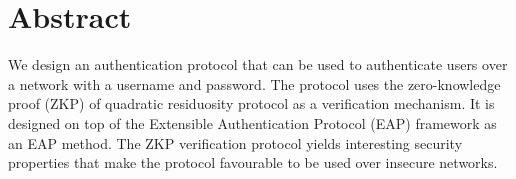 \section*{Abstract} %
We design an authentication protocol that can be used to authenticate users over a network with a username and password.
The protocol uses the zero-knowledge proof (ZKP) of quadratic residuosity protocol as a verification mechanism.
It is designed on top of the Extensible Authentication Protocol (EAP) framework as an EAP method.
The ZKP verification protocol yields interesting security properties that make the protocol favourable to be used over insecure networks.

\newpage